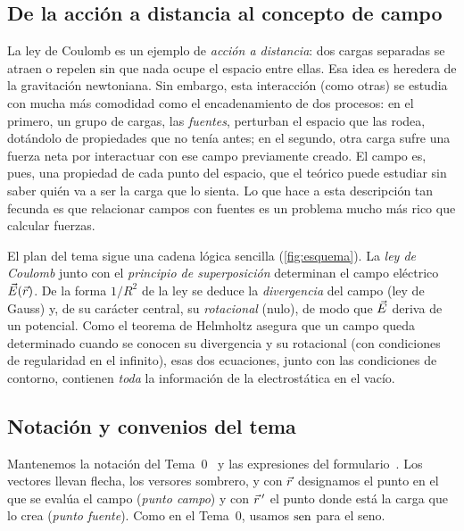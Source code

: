 \subsection{De la acción a distancia al concepto de campo}\label{sec:campo-idea}
La ley de Coulomb es un ejemplo de \emph{acción a distancia}: dos cargas separadas se
atraen o repelen sin que nada ocupe el espacio entre ellas. Esa idea es heredera de la gravitación
newtoniana. Sin embargo, esta interacción (como otras) se estudia con mucha más comodidad
como el encadenamiento de dos procesos: en el primero, un grupo de cargas, las \emph{fuentes},
perturban el espacio que las rodea, dotándolo de propiedades que no tenía antes; en el segundo,
otra carga sufre una fuerza neta por interactuar con ese campo previamente creado. El campo es,
pues, una propiedad de cada punto del espacio, que el teórico puede estudiar sin saber quién va
a ser la carga que lo sienta. Lo que hace a esta descripción tan fecunda es que relacionar
campos con fuentes es un problema mucho más rico que calcular fuerzas.

El plan del tema sigue una cadena lógica sencilla (\cref{fig:esquema}). La \emph{ley de
Coulomb} junto con el \emph{principio de superposición} determinan el campo eléctrico
$\vec{E}(\vec{r})$. De la forma $1/R^{2}$ de la ley se deduce la \emph{divergencia} del campo
(ley de Gauss) y, de su carácter central, su \emph{rotacional} (nulo), de modo que $\vec{E}$ deriva
de un potencial. Como el teorema de Helmholtz asegura que un campo queda determinado cuando se
conocen su divergencia y su rotacional (con condiciones de regularidad en el infinito), esas dos
ecuaciones, junto con las condiciones de contorno, contienen \emph{toda} la información de la
electrostática en el vacío.



\subsection{Notación y convenios del tema}\label{sec:notacion}
Mantenemos la notación del Tema~0~\cite{TEMA0,NAVAS} y las expresiones del
formulario~\cite{FORMULARIO}. Los vectores llevan flecha, los versores sombrero, y con
$\vec{r}$ designamos el punto en el que se evalúa el campo (\emph{punto campo}) y con
$\vec{r}\,'$ el punto donde está la carga que lo crea (\emph{punto fuente}). Como en el
Tema~0, usamos $\operatorname{sen}$ para el seno.

